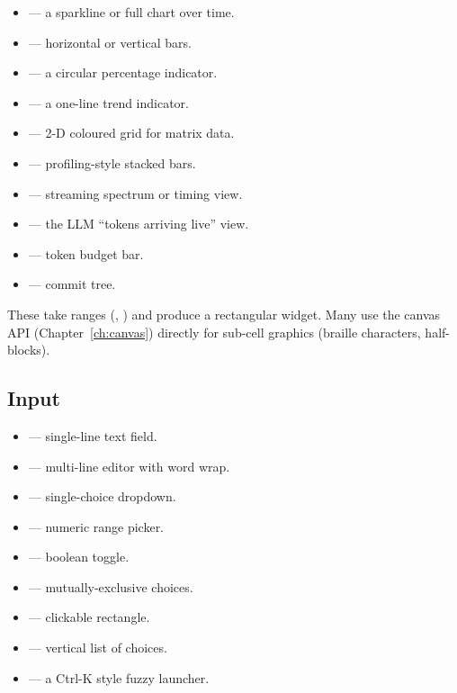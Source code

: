 \begin{itemize}[leftmargin=*]
  \item {} --- a sparkline or full chart over time.
  \item {} --- horizontal or vertical bars.
  \item {} --- a circular percentage indicator.
  \item {} --- a one-line trend indicator.
  \item {} --- 2-D coloured grid for matrix data.
  \item {} --- profiling-style stacked bars.
  \item {} --- streaming spectrum or timing view.
  \item {} --- the LLM ``tokens arriving live'' view.
  \item {} --- token budget bar.
  \item {} --- commit tree.
\end{itemize}

These take ranges (, )
and produce a rectangular widget. Many use the canvas API
(Chapter~\ref{ch:canvas}) directly for sub-cell graphics (braille
characters, half-blocks).

\subsection{Input}

\begin{itemize}[leftmargin=*]
  \item {} --- single-line text field.
  \item {} --- multi-line editor with word wrap.
  \item {} --- single-choice dropdown.
  \item {} --- numeric range picker.
  \item {} --- boolean toggle.
  \item {} --- mutually-exclusive choices.
  \item {} --- clickable rectangle.
  \item {} --- vertical list of choices.
  \item {} --- a Ctrl-K style fuzzy launcher.
\end{itemize}


